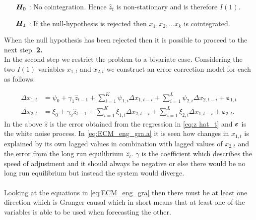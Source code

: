 \begin{itemize}
\centering
    \item[$\boldsymbol{H_0}$] : No cointegration. Hence $\hat{z}_t$ is non-stationary and is therefore $I(1)$.
    \item [$\boldsymbol{H_1}$] : If the null-hypothesis is rejected then $x_1,x_2,\ldots x_k$  is cointegrated.
\end{itemize}
When the null hypothesis has been rejected then it is possible to proceed to the next step.
\newline{}
\newline
\indent\indent \textbf{2.}\\
In the second step we restrict the problem to a bivariate case. Considering the two $I(1)$ variables $x_{1,t}$ and $x_{2,t}$ we construct an error correction model for each as follows:

\begin{subequations}\label{eq:ECM_eng_gra}
\begin{align}
    \Delta x_{1,t} &= \psi_0 + \gamma_1 \hat{z}_{t-1} + \sum^K_{i=1} \psi_{1,i} \Delta x_{1,t-i} + \sum^L_{i=1} \psi_{2,i} \Delta x_{2,t-i} + \boldsymbol{\varepsilon}_{1,t} \label{eq:ECM_eng_gra.a} \\
    \Delta x_{2,t} &= \xi_0 + \gamma_2 \hat{z}_{t-1} + \sum^K_{i=1} \xi_{1,i} \Delta x_{2,t-i} + \sum^L_{i=1} \xi_{2,i} \Delta x_{1,t-i} + \boldsymbol{\varepsilon}_{2,t}. \label{eq:ECM_eng_gra.b}
\end{align}
\end{subequations}
In the above $\hat{z}$ is the error obtained from the regression in \eqref{eq:z hat_t} and $\boldsymbol{\varepsilon}$ is the white noise process. In \eqref{eq:ECM_eng_gra.a} it is seen how changes in $x_{1,t}$ is explained by its own lagged values in combination with lagged values of $x_{2,t}$ and the error from the long run equilibrium $\hat{z}_t$. $\gamma$ is the coefficient which describes the speed of adjustment and it should always be negative or else there would be no long run equilibrium but instead the system would diverge.\\\\
Looking at the equations in \eqref{eq:ECM_eng_gra} then there must be at least one direction which is Granger causal which in short means that at least one of the variables is able to be used when forecasting the other.

